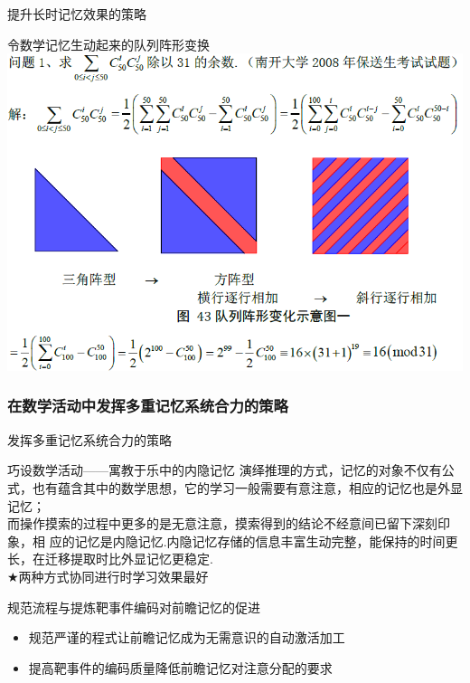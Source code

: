 \documentclass[serif]{beamer}
\begin{document}
        \begin{frame}{提升长时记忆效果的策略}
        \begin{block}{令数学记忆生动起来的队列阵形变换}
        	\includegraphics[scale=0.4]{array.png}
        \end{block}
        \end{frame}
    
    \subsubsection{在数学活动中发挥多重记忆系统合力的策略}
         \begin{frame}{发挥多重记忆系统合力的策略}
           \begin{block}{巧设数学活动——寓教于乐中的内隐记忆}
           	演绎推理的方式，记忆的对象不仅有公式，也有蕴含其中的数学思想，它的学习一般需要有意注意，相应的记忆也是外显记忆；\\
           	而操作摸索的过程中更多的是无意注意，摸索得到的结论不经意间已留下深刻印象，相
           	应的记忆是内隐记忆.内隐记忆存储的信息丰富生动完整，能保持的时间更长，在迁移提取时比外显记忆更稳定.\\
            $\bigstar $\quad	两种方式协同进行时学习效果最好
           \end{block}
           \pause
           \begin{block}{规范流程与提炼靶事件编码对前瞻记忆的促进}
           	  \begin{itemize}
           	   \item 规范严谨的程式让前瞻记忆成为无需意识的自动激活加工
           	   \item 提高靶事件的编码质量降低前瞻记忆对注意分配的要求
             \end{itemize}
           \end{block}
         \end{frame}
     
\end{document}
